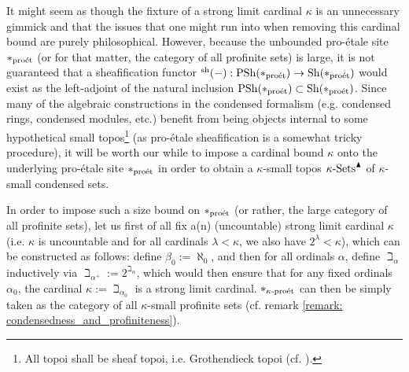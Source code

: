             \begin{remark} \label{remark: condensed_sets_set_theoretic_issues}
                It might seem as though the fixture of a strong limit cardinal $\kappa$ is an unnecessary gimmick and that the issues that one might run into when removing this cardinal bound are purely philosophical. However, because the unbounded pro-\'etale site $*_{\mathrm{pro\acute{e}t}}$ (or for that matter, the category of all profinite sets) is large, it is not guaranteed that a sheafification functor ${}^{\mathrm{sh}}(-): \mathrm{PSh}(*_{\mathrm{pro\acute{e}t}}) \to \mathrm{Sh}(*_{\mathrm{pro\acute{e}t}})$ would exist as the left-adjoint of the natural inclusion $\mathrm{PSh}(*_{\mathrm{pro\acute{e}t}}) \subset \mathrm{Sh}(*_{\mathrm{pro\acute{e}t}})$. Since many of the algebraic constructions in the condensed formalism (e.g. condensed rings, condensed modules, etc.) benefit from being objects internal to some hypothetical small topos\footnote{All topoi shall be sheaf topoi, i.e. Grothendieck topoi (cf. \cite[Expos\'e IV]{sga4}).} (as pro-\'etale sheafification is a somewhat tricky procedure), it will be worth our while to impose a cardinal bound $\kappa$ onto the underlying pro-\'etale site $*_{\mathrm{pro\acute{e}t}}$ in order to obtain a $\kappa$-small topos $\kappa\text{-}\mathrm{Sets}^{\blacktriangle}$ of $\kappa$-small condensed sets.
                
                In order to impose such a size bound on $*_{\mathrm{pro\acute{e}t}}$ (or rather, the large category of all profinite sets), let us first of all fix a(n) (uncountable) strong limit cardinal $\kappa$ (i.e. $\kappa$ is uncountable and for all cardinals $\lambda < \kappa$, we also have $2^{\lambda} < \kappa$), which can be constructed as follows: define $\beta_0 := \aleph_0$, and then for all ordinals $\alpha$, define $\beth_{\alpha}$ inductively via $\beth_{\alpha^+} := 2^{\beth_{\alpha}}$, which would then ensure that for any fixed ordinals $\alpha_0$, the cardinal $\kappa := \beth_{\alpha_0}$ is a strong limit cardinal. $*_{\kappa\text{-}\mathrm{pro\acute{e}t}}$ can then be simply taken as the category of all $\kappa$-small profinite sets (cf. remark \ref{remark: condensedness_and_profiniteness}). 
                

\end{remark}
